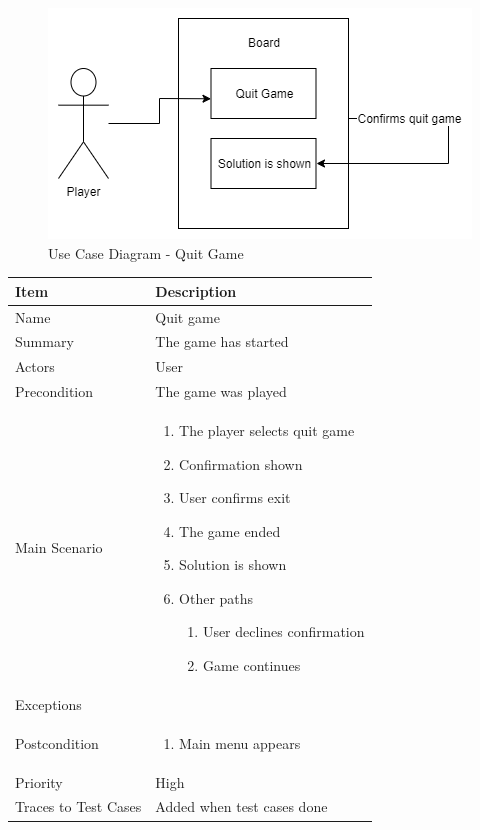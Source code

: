 \documentclass[12pt]{article}
\begin{document}
\begin{figure}[htbp]
    \centering
    \includegraphics[scale=0.6]{QuitGame}
    \caption{Use Case Diagram - Quit Game}
    \label{fig:QuitGame}
\end{figure}

\begin{center}
\setlength{\tabcolsep}{18pt}
\renewcommand{\arraystretch}{1.3}
\begin{tabular}{ |p{3cm}|p{10cm}| }
    \hline
    \rowcolor{green}
   Item & Description \\
    \hline
    Name & Quit game \\
    \hline
    Summary & The game has started \\
    \hline
    Actors & User \\
    \hline
    Precondition & The game was played \\
    \hline
    Main Scenario &     
    \vspace*{-0.2in}
    \begin{enumerate}
    \item The player selects quit game
    \item Confirmation shown
    \item User confirms exit
    \item The game ended
    \item Solution is shown
    \item Other paths
        \begin{enumerate}
            \item User declines confirmation
            \item Game continues
        \end{enumerate}
    \end{enumerate}  \\
    \hline
    Exceptions &  \\
    \hline
    Postcondition & 
    \vspace*{-0.2in}
    \begin{enumerate}
        \item Main menu appears
    \end{enumerate}  \\
    \hline
    Priority & High  \\
    \hline
    Traces to Test Cases & Added when test cases done  \\
    \hline
\end{tabular}
\end{center}
\end{document}
